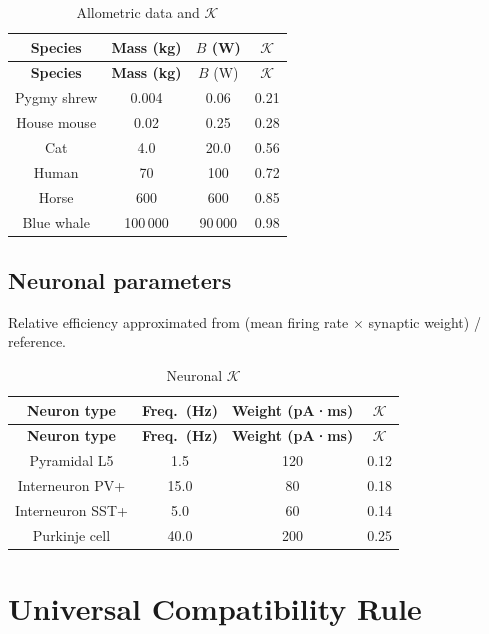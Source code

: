 \documentclass[12pt,a4paper]{article}
\newcommand{\REL}{\mathcal{K}}          %
\begin{document}
	\begin{longtable}{|c|c|c|c|}
		\caption{Allometric data and \(\REL\)}\label{tab:allometry}\\
		\hline
		\textbf{Species} & \textbf{Mass (kg)} & \(B\) (W) & \(\REL\) \\
		\hline
		\endfirsthead
		\hline
		\textbf{Species} & \textbf{Mass (kg)} & \(B\) (W) & \(\REL\) \\
		\hline
		\endhead
		\hline
		Pygmy shrew & 0.004 & 0.06 & 0.21 \\
		House mouse & 0.02 & 0.25 & 0.28 \\
		Cat & 4.0 & 20.0 & 0.56 \\
		Human & 70 & 100 & 0.72 \\
		Horse & 600 & 600 & 0.85 \\
		Blue whale & 100\,000 & 90\,000 & 0.98 \\
		\hline
	\end{longtable}
	
	\subsection{Neuronal parameters}
	\label{sec:neural}
	Relative efficiency approximated from (mean firing rate \(\times\) synaptic weight) / reference.
	
	\begin{longtable}{|c|c|c|c|}
		\caption{Neuronal \(\REL\)}\label{tab:neural}\\
		\hline
		\textbf{Neuron type} & \textbf{Freq.\ (Hz)} & \textbf{Weight (pA·ms)} & \(\REL\) \\
		\hline
		\endfirsthead
		\hline
		\textbf{Neuron type} & \textbf{Freq.\ (Hz)} & \textbf{Weight (pA·ms)} & \(\REL\) \\
		\hline
		\endhead
		\hline
		Pyramidal L5 & 1.5 & 120 & 0.12 \\
		Interneuron PV+ & 15.0 & 80 & 0.18 \\
		Interneuron SST+ & 5.0 & 60 & 0.14 \\
		Purkinje cell & 40.0 & 200 & 0.25 \\
		\hline
	\end{longtable}
	
	\section{Universal Compatibility Rule}
	\label{sec:compatibility}
	
\end{document}
